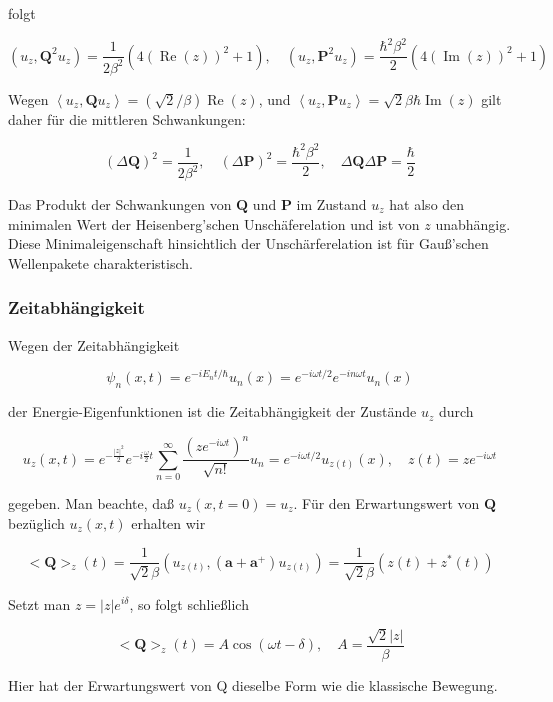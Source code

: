 \documentclass[10pt, letterpaper]{article}
\begin{document}
folgt

$$
\left(u_{z}, \mathbf{Q}^{2} u_{z}\right)=\frac{1}{2 \beta^{2}}\left(4(\operatorname{Re}(z))^{2}+1\right), \quad\left(u_{z}, \mathbf{P}^{2} u_{z}\right)=\frac{\hbar^{2} \beta^{2}}{2}\left(4(\operatorname{Im}(z))^{2}+1\right)
$$

Wegen $\left\langle u_{z}, \mathbf{Q} u_{z}\right\rangle=(\sqrt{2} / \beta) \operatorname{Re}(z)$, und $\left\langle u_{z}, \mathbf{P} u_{z}\right\rangle=\sqrt{2} \beta \hbar \operatorname{Im}(z)$ gilt daher für die mittleren Schwankungen:

$$
(\Delta \mathbf{Q})^{2}=\frac{1}{2 \beta^{2}}, \quad(\Delta \mathbf{P})^{2}=\frac{\hbar^{2} \beta^{2}}{2}, \quad \Delta \mathbf{Q} \Delta \mathbf{P}=\frac{\hbar}{2}
$$

Das Produkt der Schwankungen von $\mathbf{Q}$ und $\mathbf{P}$ im Zustand $u_{z}$ hat also den minimalen Wert der Heisenberg'schen Unschäferelation und ist von $z$ unabhängig. Diese Minimaleigenschaft hinsichtlich der Unschärferelation ist für Gauß'schen Wellenpakete charakteristisch.

\subsubsection*{Zeitabhängigkeit}
Wegen der Zeitabhängigkeit

$$
\psi_{n}(x, t)=e^{-i E_{n} t / \hbar} u_{n}(x)=e^{-i \omega t / 2} e^{-i n \omega t} u_{n}(x)
$$

der Energie-Eigenfunktionen ist die Zeitabhängigkeit der Zustände $u_{z}$ durch

$$
u_{z}(x, t)=e^{-\frac{|z|^{2}}{2}} e^{-i \frac{\omega}{2} t} \sum_{n=0}^{\infty} \frac{\left(z e^{-i \omega t}\right)^{n}}{\sqrt{n!}} u_{n}=e^{-i \omega t / 2} u_{z(t)}(x), \quad z(t)=z e^{-i \omega t}
$$

gegeben. Man beachte, daß $u_{z}(x, t=0)=u_{z}$. Für den Erwartungswert von $\mathbf{Q}$ bezüglich $u_{z}(x, t)$ erhalten wir

$$
<\mathbf{Q}>_{z}(t)=\frac{1}{\sqrt{2} \beta}\left(u_{z(t)},\left(\mathbf{a}+\mathbf{a}^{+}\right) u_{z(t)}\right)=\frac{1}{\sqrt{2} \beta}\left(z(t)+z^{*}(t)\right)
$$

Setzt man $z=|z| e^{i \delta}$, so folgt schließlich

$$
<\mathbf{Q}>_{z}(t)=A \cos (\omega t-\delta), \quad A=\frac{\sqrt{2}|z|}{\beta}
$$

Hier hat der Erwartungswert von Q dieselbe Form wie die klassische Bewegung.
\end{document}
